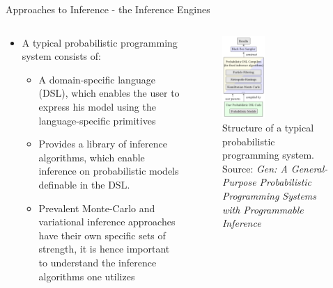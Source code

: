 \documentclass[AERbeamer%
              ,optEnglish%
              ,optBiber%
              ,optBibstyleAlphabetic%
              ,optBeamerClassicFormat%
              ]{AERlatex}%
\begin{document}
\begin{frame}[c]{Approaches to Inference - the Inference Engines}
    \begin{columns}[T]
        \begin{column}{0.48\textwidth}
            \centering
            \begin{itemize}
                \item A typical probabilistic programming system consists of:
                \begin{itemize}
                    \item A domain-specific language (DSL), which enables the user to express his model using the language-specific primitives
                    \item Provides a library of inference algorithms, which enable inference on probabilistic models definable in the
                          DSL.
                    \item Prevalent Monte-Carlo and variational inference approaches have their own specific sets of strength, it is
                          hence important to understand the inference algorithms one utilizes
                \end{itemize}
            \end{itemize}
        \end{column}
        \begin{column}{0.48\textwidth}
            \centering
            \begin{figure}
                \centering
                \includegraphics[width=0.4\textwidth]{TypicalPPS.png}
                \caption{Structure of a typical probabilistic programming system. Source: \textit{Gen: A General-Purpose Probabilistic Programming Systems with Programmable Inference}}
            \end{figure}
        \end{column}
    \end{columns}
\end{frame}
\end{document}
